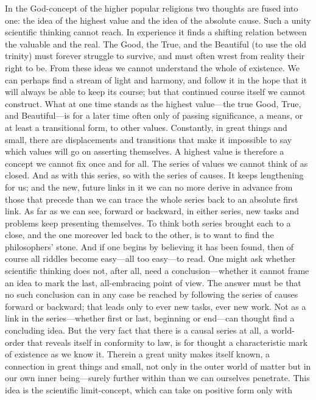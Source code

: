\documentclass[12pt,a4paper]{article}
\newcommand{\opage}[1]{\marginnote{\footnotesize\textit{[#1]}}}
\begin{document}
In the God-concept of the higher popular religions two thoughts are fused into one:
the idea of the highest value and the idea of the absolute cause. Such a unity
scientific thinking cannot reach. In experience it finds a shifting relation between
the valuable and the real. The Good, the True, and the Beautiful (to use the old
trinity) must forever struggle to survive, and must often wrest from reality their
right to be. From these ideas we cannot understand the whole of existence. We can
perhaps find a stream of light and harmony, and follow it in the hope that it will
always be able to keep its course; but that continued course itself we cannot
construct. What at one time stands as the highest value---the true Good, True, and
Beautiful---is for a later time often only of passing significance, a means, or at
least a transitional form, to other values. Constantly, in great things and small,
there are displacements and transitions that make it impossible to say which values
will go on asserting themselves. A highest value is therefore a concept we cannot fix
once and for all. The series of values we cannot think of as closed. And as with this
series, so with the series of causes. It keeps lengthening for us; and the new,
future links in it we can no more derive in advance from those that precede than we
can trace the whole series back to an absolute first link. As far as we can see,
forward or backward, in either series, new tasks and problems keep presenting
themselves. To think both series brought each to a close, and the one moreover led
back to the other, is to want to \opage{34}find the philosophers' stone. And if one begins by
believing it has been found, then of course all riddles become easy---all too
easy---to read. One might ask whether scientific thinking does not, after all, need a
conclusion---whether it cannot frame an idea to mark the last, all-embracing point of
view. The answer must be that no such conclusion can in any case be reached by
following the series of causes forward or backward; that leads only to ever new
tasks, ever new work. Not as a link in the series---whether first or last, beginning
or end---can thought find a concluding idea. But the very fact that there is a causal
series at all, a world-order that reveals itself in conformity to law, is for thought
a characteristic mark of existence as we know it. Therein a great unity makes itself
known, a connection in great things and small, not only in the outer world of matter
but in our own inner being---surely further within than we can ourselves penetrate.
This idea is the scientific limit-concept, which can take on positive form only with
\end{document}
